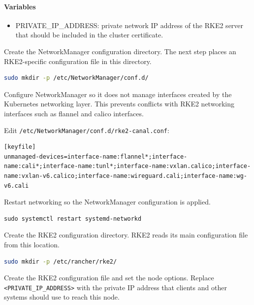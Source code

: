\documentclass{article}
\begin{document}
\paragraph{Variables}
\begin{itemize}
	\item PRIVATE\_IP\_ADDRESS: private network IP address of the RKE2 server that should be included in the cluster certificate.
\end{itemize}

Create the NetworkManager configuration directory. The next step places an RKE2-specific configuration file in this directory.

\begin{lstlisting}[language=sh]
sudo mkdir -p /etc/NetworkManager/conf.d/
\end{lstlisting}

Configure NetworkManager so it does not manage interfaces created by the Kubernetes networking layer. This prevents conflicts with RKE2 networking interfaces such as flannel and calico interfaces.

\vspace{0.5cm}

Edit \texttt{/etc/NetworkManager/conf.d/rke2-canal.conf}:
\begin{lstlisting}
[keyfile]
unmanaged-devices=interface-name:flannel*;interface-name:cali*;interface-name:tunl*;interface-name:vxlan.calico;interface-name:vxlan-v6.calico;interface-name:wireguard.cali;interface-name:wg-v6.cali
\end{lstlisting}

Restart networking so the NetworkManager configuration is applied.

\begin{lstlisting}
sudo systemctl restart systemd-networkd
\end{lstlisting}

Create the RKE2 configuration directory. RKE2 reads its main configuration file from this location.

\begin{lstlisting}[language=sh]
sudo mkdir -p /etc/rancher/rke2/
\end{lstlisting}

Create the RKE2 configuration file and set the node options. Replace \texttt{<PRIVATE\_IP\_ADDRESS>} with the private IP address that clients and other systems should use to reach this node.

\vspace{0.5cm}
\end{document}
